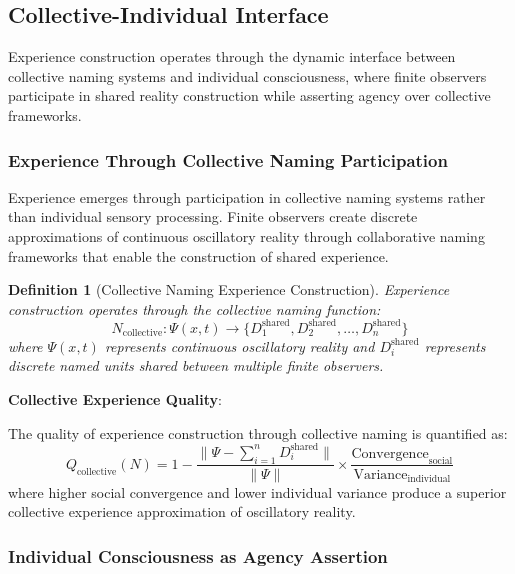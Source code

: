 \documentclass{article}
\newtheorem{definition}[theorem]{Definition}
\begin{document}
\subsection{Collective-Individual Interface}

Experience construction operates through the dynamic interface between collective naming systems and individual consciousness, where finite observers participate in shared reality construction while asserting agency over collective frameworks.

\subsubsection{Experience Through Collective Naming Participation}

Experience emerges through participation in collective naming systems rather than individual sensory processing. Finite observers create discrete approximations of continuous oscillatory reality through collaborative naming frameworks that enable the construction of shared experience.

\begin{definition}[Collective Naming Experience Construction]
Experience construction operates through the collective naming function:
\begin{equation}
N_{\text{collective}}: \Psi(x,t) \rightarrow \{D_1^{\text{shared}}, D_2^{\text{shared}}, \ldots, D_n^{\text{shared}}\}
\end{equation}
where $\Psi(x,t)$ represents continuous oscillatory reality and $D_i^{\text{shared}}$ represents discrete named units shared between multiple finite observers.
\end{definition}

\textbf{Collective Experience Quality}:

The quality of experience construction through collective naming is quantified as:
\begin{equation}
Q_{\text{collective}}(N) = 1 - \frac{\|\Psi - \sum_{i=1}^{n} D_i^{\text{shared}}\|}{\|\Psi\|} \times \frac{\text{Convergence}_{\text{social}}}{\text{Variance}_{\text{individual}}}
\end{equation}
where higher social convergence and lower individual variance produce a superior collective experience approximation of oscillatory reality.

\subsubsection{Individual Consciousness as Agency Assertion}
\end{document}
